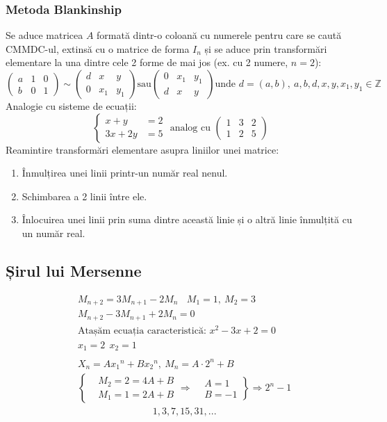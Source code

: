 \documentclass[12pt]{article}
\theoremstyle{definition}
\begin{document}
\subsubsection*{Metoda Blankinship}
Se aduce matricea $A$ formată dintr-o coloană cu numerele pentru care se caută CMMDC-ul, extinsă cu o matrice de forma $I_n$ și se aduce prin transformări elementare la una dintre cele 2 forme de mai jos (ex. cu 2 numere, $n=2$):
\[\begin{pmatrix}
a&1&0\\
b&0&1
\end{pmatrix} \sim \begin{pmatrix}
d&x&y\\
0&x_1&y_1
\end{pmatrix} \text{sau} \begin{pmatrix}
0&x_1&y_1\\
d&x&y
\end{pmatrix} \text{unde } d=(a,b), \ a,b,d,x,y,x_1,y_1\in\mathbb{Z}
\]
Analogie cu sisteme de ecuații:\[
\left\{\begin{aligned}
x+y&=2\\
3x+2y&=5
\end{aligned} \right. \text{ analog cu } \begin{pmatrix}
1&3&2\\
1&2&5
\end{pmatrix}
\]
Reamintire transformări elementare asupra liniilor unei matrice:
\begin{enumerate}[label={$T_{\arabic*}: \ $}]
  \item Înmulțirea unei linii printr-un număr real nenul.
  \item Schimbarea a 2 linii între ele.
  \item Înlocuirea unei linii prin suma dintre această linie și o altră linie înmulțită cu un număr real.
\end{enumerate}

\subsection*{Șirul lui Mersenne}

\[\begin{aligned}
&M_{n+2}=3M_{n+1}-2M_n \ \ \ \ M_1=1, \ M_2=3 \\
&M_{n+2}-3M_{n+1}+2M_n=0\\
&\text{Atașăm ecuația caracteristică: }x^2-3x+2=0\\
&x_1=2 \ \ x_2=1\\
&\\
&X_n=A{x_1}^n+B{x_2}^n, \ M_n=A\cdot 2^n +B\\
	&\left\{ \begin{aligned}
		&M_2=2=4A+B\\
		&M_1=1=2A+B
	\end{aligned} \right. \Rightarrow \left. \begin{aligned}
									&A=1\\
									&B=-1
									\end{aligned} \right\} \Rightarrow 2^n-1
\end{aligned}\]
\[\begin{aligned}
&1,3,7,15,31,...
\end{aligned}\]
\end{document}
